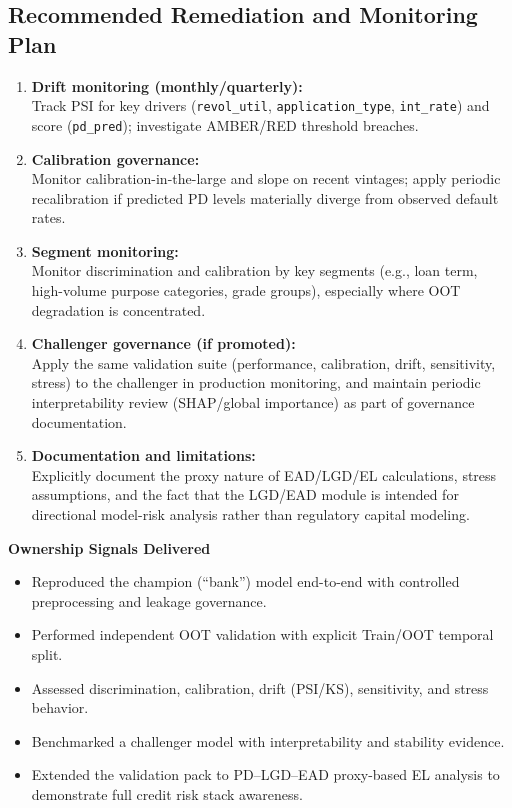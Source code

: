 \documentclass[11pt,a4paper]{article}
\begin{document}
\subsection{Recommended Remediation and Monitoring Plan}
\begin{enumerate}[leftmargin=*, itemsep=0.35em]
\item \textbf{Drift monitoring (monthly/quarterly):}\\
Track PSI for key drivers (\texttt{revol\_util}, \texttt{application\_type}, \texttt{int\_rate}) and score (\texttt{pd\_pred}); investigate AMBER/RED threshold breaches.

\item \textbf{Calibration governance:}\\
Monitor calibration-in-the-large and slope on recent vintages; apply periodic recalibration if predicted PD levels materially diverge from observed default rates.

\item \textbf{Segment monitoring:}\\
Monitor discrimination and calibration by key segments (e.g., loan term, high-volume purpose categories, grade groups), especially where OOT degradation is concentrated.

\item \textbf{Challenger governance (if promoted):}\\
Apply the same validation suite (performance, calibration, drift, sensitivity, stress) to the challenger in production monitoring, and maintain periodic interpretability review (SHAP/global importance) as part of governance documentation.

\item \textbf{Documentation and limitations:}\\
Explicitly document the proxy nature of EAD/LGD/EL calculations, stress assumptions, and the fact that the LGD/EAD module is intended for directional model-risk analysis rather than regulatory capital modeling.
\end{enumerate}

\vspace{0.4em}
\noindent\textbf{Ownership Signals Delivered}
\begin{itemize}[leftmargin=*, itemsep=0.25em]
\item Reproduced the champion (``bank'') model end-to-end with controlled preprocessing and leakage governance.
\item Performed independent OOT validation with explicit Train/OOT temporal split.
\item Assessed discrimination, calibration, drift (PSI/KS), sensitivity, and stress behavior.
\item Benchmarked a challenger model with interpretability and stability evidence.
\item Extended the validation pack to PD--LGD--EAD proxy-based EL analysis to demonstrate full credit risk stack awareness.
\end{itemize}
\end{document}

